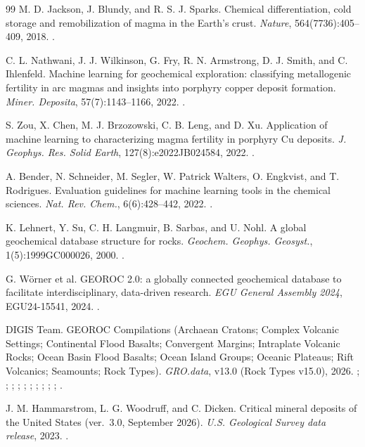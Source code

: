 \documentclass[10pt,twocolumn,letterpaper]{article}
\begin{document}
\begin{thebibliography}{99}
 M. D. Jackson, J. Blundy, and R. S. J. Sparks. Chemical differentiation, cold storage and remobilization of magma in the Earth's crust. \textit{Nature}, 564(7736):405--409, 2018. .

 C. L. Nathwani, J. J. Wilkinson, G. Fry, R. N. Armstrong, D. J. Smith, and C. Ihlenfeld. Machine learning for geochemical exploration: classifying metallogenic fertility in arc magmas and insights into porphyry copper deposit formation. \textit{Miner. Deposita}, 57(7):1143--1166, 2022. .

 S. Zou, X. Chen, M. J. Brzozowski, C. B. Leng, and D. Xu. Application of machine learning to characterizing magma fertility in porphyry Cu deposits. \textit{J. Geophys. Res. Solid Earth}, 127(8):e2022JB024584, 2022. .

 A. Bender, N. Schneider, M. Segler, W. Patrick Walters, O. Engkvist, and T. Rodrigues. Evaluation guidelines for machine learning tools in the chemical sciences. \textit{Nat. Rev. Chem.}, 6(6):428--442, 2022. .

 K. Lehnert, Y. Su, C. H. Langmuir, B. Sarbas, and U. Nohl. A global geochemical database structure for rocks. \textit{Geochem. Geophys. Geosyst.}, 1(5):1999GC000026, 2000. .

 G. Wörner et al. GEOROC 2.0: a globally connected geochemical database to facilitate interdisciplinary, data-driven research. \textit{EGU General Assembly 2024}, EGU24-15541, 2024. .

 DIGIS Team. GEOROC Compilations (Archaean Cratons; Complex Volcanic Settings; Continental Flood Basalts; Convergent Margins; Intraplate Volcanic Rocks; Ocean Basin Flood Basalts; Ocean Island Groups; Oceanic Plateaus; Rift Volcanics; Seamounts; Rock Types). \textit{GRO.data}, v13.0 (Rock Types v15.0), 2026. ; ; ; ; ; ; ; ; ; ; .

 J. M. Hammarstrom, L. G. Woodruff, and C. Dicken. Critical mineral deposits of the United States (ver.~3.0, September 2026). \textit{U.S. Geological Survey data release}, 2023. .


\end{thebibliography}
\end{document}
